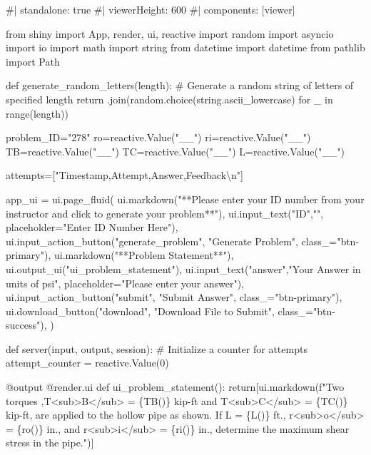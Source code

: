 \documentclass[
  letterpaper,
  DIV=11,
  numbers=noendperiod]{scrreprt}
\newenvironment{Shaded}{\begin{snugshade}}{\end{snugshade}}
\newcommand{\NormalTok}[1]{\textcolor[rgb]{0.00,0.23,0.31}{#1}}
\begin{document}
\begin{Shaded}
\begin{Highlighting}[]
\NormalTok{\#| standalone: true}
\NormalTok{\#| viewerHeight: 600}
\NormalTok{\#| components: [viewer]}

\NormalTok{from shiny import App, render, ui, reactive}
\NormalTok{import random}
\NormalTok{import asyncio}
\NormalTok{import io}
\NormalTok{import math}
\NormalTok{import string}
\NormalTok{from datetime import datetime}
\NormalTok{from pathlib import Path}

\NormalTok{def generate\_random\_letters(length):}
\NormalTok{    \# Generate a random string of letters of specified length}
\NormalTok{    return \textquotesingle{}\textquotesingle{}.join(random.choice(string.ascii\_lowercase) for \_ in range(length)) }

\NormalTok{problem\_ID="278"}
\NormalTok{ro=reactive.Value("\_\_")}
\NormalTok{ri=reactive.Value("\_\_")}
\NormalTok{TB=reactive.Value("\_\_")}
\NormalTok{TC=reactive.Value("\_\_")}
\NormalTok{L=reactive.Value("\_\_")}

\NormalTok{attempts=["Timestamp,Attempt,Answer,Feedback\textbackslash{}n"]}

\NormalTok{app\_ui = ui.page\_fluid(}
\NormalTok{    ui.markdown("**Please enter your ID number from your instructor and click to generate your problem**"),}
\NormalTok{    ui.input\_text("ID","", placeholder="Enter ID Number Here"),}
\NormalTok{    ui.input\_action\_button("generate\_problem", "Generate Problem", class\_="btn{-}primary"),}
\NormalTok{    ui.markdown("**Problem Statement**"),}
\NormalTok{    ui.output\_ui("ui\_problem\_statement"),}
\NormalTok{    ui.input\_text("answer","Your Answer in units of psi", placeholder="Please enter your answer"),}
\NormalTok{    ui.input\_action\_button("submit", "Submit Answer", class\_="btn{-}primary"),}
\NormalTok{    ui.download\_button("download", "Download File to Submit", class\_="btn{-}success"),}
\NormalTok{)}


\NormalTok{def server(input, output, session):}
\NormalTok{    \# Initialize a counter for attempts}
\NormalTok{    attempt\_counter = reactive.Value(0)}

\NormalTok{    @output}
\NormalTok{    @render.ui}
\NormalTok{    def ui\_problem\_statement():}
\NormalTok{        return[ui.markdown(f"Two torques ,T\textless{}sub\textgreater{}B\textless{}/sub\textgreater{} = \{TB()\} kip{-}ft and T\textless{}sub\textgreater{}C\textless{}/sub\textgreater{} = \{TC()\} kip{-}ft, are applied to the hollow pipe as shown. If L = \{L()\} ft., r\textless{}sub\textgreater{}o\textless{}/sub\textgreater{} = \{ro()\} in., and r\textless{}sub\textgreater{}i\textless{}/sub\textgreater{} = \{ri()\} in., determine the maximum shear stress in the pipe.")]}
    

\end{Highlighting}
\end{Shaded}
\end{document}
